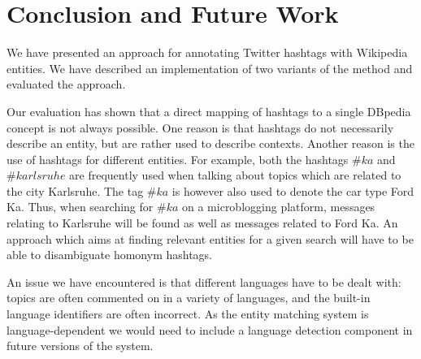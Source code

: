 \documentclass{llncs}
\begin{document}
\section{Conclusion and Future Work}
\label{sect:conclusion}

We have presented an approach for annotating Twitter hashtags with Wikipedia entities.
We have described an implementation of two variants of the method and evaluated the approach.

Our evaluation has shown that a direct mapping of hashtags to a single DBpedia concept is not always possible.
One reason is that hashtags do not necessarily describe an entity, but are rather used to describe contexts.
Another reason is the use of hashtags for different entities.
For example, both the hashtags $\#ka$ and $\#karlsruhe$ are frequently used when talking about topics which are related to the city Karlsruhe.
The tag $\#ka$ is however also used to denote the car type Ford Ka.
Thus, when searching for $\#ka$ on a microblogging platform, messages relating to Karlsruhe will be found as well as messages related to Ford Ka.
An approach which aims at finding relevant entities for a given search will have to be able to disambiguate homonym hashtags.

An issue we have encountered is that different languages have to be dealt with: topics are often commented on in a variety of languages, and the built-in language identifiers are often incorrect.
As the entity matching system is language-dependent we would need to include a language detection component in future versions of the system.






\end{document}
